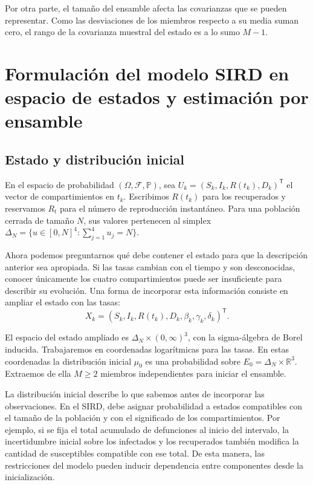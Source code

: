 Por otra parte, el tamaño del ensamble afecta las covarianzas que se pueden representar. Como las desviaciones de los miembros respecto a su media suman cero, el rango de la covarianza muestral del estado es a lo sumo $M-1$.

\section{Formulación del modelo SIRD en espacio de estados y estimación por ensamble}

\subsection*{Estado y distribución inicial}

En el espacio de probabilidad $(\Omega,\mathcal F,\mathbb P)$, sea $U_k=(S_k,I_k,R(t_k),D_k)^{\mathsf T}$ el vector de compartimientos en $t_k$. Escribimos $R(t_k)$ para los recuperados y reservamos $R_t$ para el número de reproducción instantáneo. Para una población cerrada de tamaño $N$, sus valores pertenecen al simplex $\Delta_N=\{u\in[0,N]^4:\sum_{j=1}^4 u_j=N\}$.

Ahora podemos preguntarnos qué debe contener el estado para que la descripción anterior sea apropiada. Si las tasas cambian con el tiempo y son desconocidas, conocer únicamente los cuatro compartimientos puede ser insuficiente para describir su evolución. Una forma de incorporar esta información consiste en ampliar el estado con las tasas:
\begin{equation}
    X_k=(S_k,I_k,R(t_k),D_k,\beta_k,\gamma_k,\delta_k)^{\mathsf T}.
    \label{eq:estado-ampliado}
\end{equation}

El espacio del estado ampliado es $\Delta_N\times(0,\infty)^3$, con la sigma-álgebra de Borel inducida. Trabajaremos en coordenadas logarítmicas para las tasas. En estas coordenadas la distribución inicial $\mu_0$ es una probabilidad sobre $E_0=\Delta_N\times\mathbb R^3$. Extraemos de ella $M\geq 2$ miembros independientes para iniciar el ensamble.

La distribución inicial describe lo que sabemos antes de incorporar las observaciones. En el SIRD, debe asignar probabilidad a estados compatibles con el tamaño de la población y con el significado de los compartimientos. Por ejemplo, si se fija el total acumulado de defunciones al inicio del intervalo, la incertidumbre inicial sobre los infectados y los recuperados también modifica la cantidad de susceptibles compatible con ese total. De esta manera, las restricciones del modelo pueden inducir dependencia entre componentes desde la inicialización.

